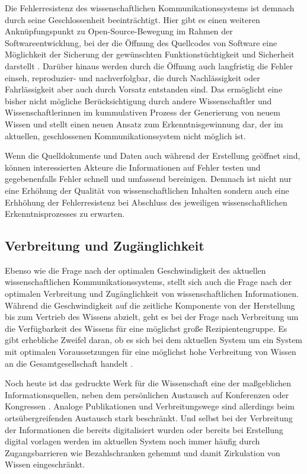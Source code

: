 Die Fehlerresistenz des wissenschaftlichen Kommunikationssystems ist demnach durch seine Geschlossenheit beeinträchtigt. Hier gibt es einen weiteren Anknüpfungspunkt zu Open-Source-Bewegung im Rahmen der Softwareentwicklung, bei der die Öffnung des Quellcodes von Software eine Möglichkeit der Sicherung der gewünschten Funktionstüchtigkeit und Sicherheit darstellt \cite{hoepman_2007_increased}. Darüber hinaus werden durch die Öffnung auch langfristig die Fehler einseh, reproduzier- und nachverfolgbar, die durch Nachlässigkeit oder Fahrlässigkeit aber auch durch Vorsatz entstanden sind. Das ermöglicht eine bisher nicht mögliche Berücksichtigung durch andere Wissenschaftler und Wissenschaftlerinnen im kummulativen Prozess der Generierung von neuem Wissen und stellt einen neuen Ansatz zum Erkenntnisgewinnung dar, der im aktuellen, geschlossenen Kommunikationssystem nicht möglich ist.

Wenn die Quelldokumente und Daten auch während der Erstellung geöffnet sind, können interessierten Akteure die Informationen auf Fehler testen und gegebenenfalls Fehler schnell und umfassend bereinigen. Demnach ist nicht nur eine Erhöhung der Qualität von wissenschaftlichen Inhalten sondern auch eine Erhhöhung der Fehlerresistenz bei Abschluss des jeweiligen wissenschaftlichen Erkenntnisprozesses zu erwarten.

\subsection{Verbreitung und Zugänglichkeit}

Ebenso wie die Frage nach der optimalen Geschwindigkeit des aktuellen wissenschaftlichen Kommunikationssystems, stellt sich auch die Frage nach der optimalen Verbreitung und Zugänglichkeit von wissenschaftlichen Informationen. Während die Geschwindigkeit auf die zeitliche Komponente von der Herstellung bis zum Vertrieb des Wissens abzielt, geht es bei der Frage nach Verbreitung um die Verfügbarkeit des Wissens für eine möglichst große Rezipientengruppe. Es gibt erhebliche Zweifel daran, ob es sich bei dem aktuellen System um ein System mit optimalen Voraussetzungen für eine möglichst hohe Verbreitung von Wissen an die Gesamtgesellschaft handelt \cite{suchen}.

Noch heute ist das gedruckte Werk für die Wissenschaft eine der maßgeblichen Informationsquellen, neben dem persönlichen Austausch auf Konferenzen oder Kongressen \cite{winkler_2011_anforderungen}. Analoge Publikationen und Verbreitungswege sind allerdings beim ortsübergreifenden Austausch stark beschränkt. Und selbst bei der Verbreitung der Informationen die bereits digitalisiert wurden oder bereits bei Erstellung digital vorlagen werden im aktuellen System noch immer häufig durch Zugangsbarrieren wie Bezahlschranken gehemmt und damit Zirkulation von Wissen eingeschränkt.

